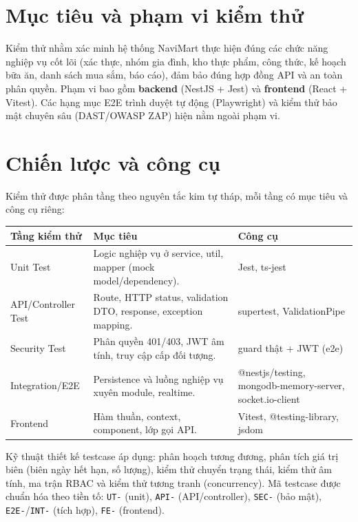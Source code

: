\section{Mục tiêu và phạm vi kiểm thử}
Kiểm thử nhằm xác minh hệ thống NaviMart thực hiện đúng các chức năng nghiệp vụ cốt lõi (xác thực, nhóm gia đình, kho thực phẩm, công thức, kế hoạch bữa ăn, danh sách mua sắm, báo cáo), đảm bảo đúng hợp đồng API và an toàn phân quyền. Phạm vi bao gồm \textbf{backend} (NestJS + Jest) và \textbf{frontend} (React + Vitest). Các hạng mục E2E trình duyệt tự động (Playwright) và kiểm thử bảo mật chuyên sâu (DAST/OWASP ZAP) hiện nằm ngoài phạm vi.

\section{Chiến lược và công cụ}
Kiểm thử được phân tầng theo nguyên tắc kim tự tháp, mỗi tầng có mục tiêu và công cụ riêng:

\begingroup
\renewcommand{\arraystretch}{1.5}
\begin{longtable}{|p{3.5cm}|p{6cm}|p{4.5cm}|}
\hline
\cellcolor[HTML]{D5F5E3}\textbf{Tầng kiểm thử} & \cellcolor[HTML]{D5F5E3}\textbf{Mục tiêu} & \cellcolor[HTML]{D5F5E3}\textbf{Công cụ} \\ \hline
Unit Test & Logic nghiệp vụ ở service, util, mapper (mock model/dependency). & Jest, ts-jest \\ \hline
API/Controller Test & Route, HTTP status, validation DTO, response, exception mapping. & supertest, ValidationPipe \\ \hline
Security Test & Phân quyền 401/403, JWT âm tính, truy cập cấp đối tượng. & guard thật + JWT (e2e) \\ \hline
Integration/E2E & Persistence và luồng nghiệp vụ xuyên module, realtime. & @nestjs/testing, mongodb-memory-server, socket.io-client \\ \hline
Frontend & Hàm thuần, context, component, lớp gọi API. & Vitest, @testing-library, jsdom \\ \hline
\end{longtable}
\endgroup

Kỹ thuật thiết kế testcase áp dụng: phân hoạch tương đương, phân tích giá trị biên (biên ngày hết hạn, số lượng), kiểm thử chuyển trạng thái, kiểm thử âm tính, ma trận RBAC và kiểm thử tương tranh (concurrency). Mã testcase được chuẩn hóa theo tiền tố: \texttt{UT-} (unit), \texttt{API-} (API/controller), \texttt{SEC-} (bảo mật), \texttt{E2E-}/\texttt{INT-} (tích hợp), \texttt{FE-} (frontend).

